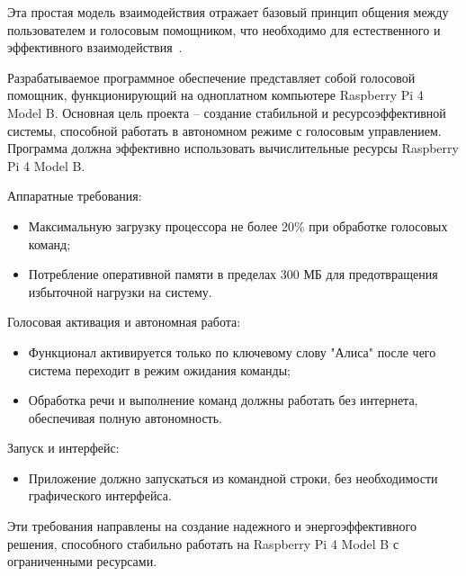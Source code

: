  Эта простая модель взаимодействия отражает базовый принцип общения между пользователем и голосовым помощником, что необходимо для естественного и эффективного взаимодействия~\cite{name22}.
 
Разрабатываемое программное обеспечение представляет собой голосовой помощник, функционирующий на одноплатном компьютере Raspberry Pi 4 Model B.
Основная цель проекта -- создание стабильной и ресурсоэффективной системы, способной работать в автономном режиме с голосовым управлением.
Программа должна эффективно использовать вычислительные ресурсы Raspberry Pi 4 Model B.

Аппаратные требования:
\begin{itemize}
	\item Максимальную загрузку процессора не более 20\% при обработке голосовых команд;
	\item Потребление оперативной памяти в пределах 300 МБ для предотвращения избыточной нагрузки на систему.
\end{itemize}

Голосовая активация и автономная работа:
\begin{itemize}
	\item Функционал активируется только по ключевому слову "Алиса" после чего система переходит в режим ожидания команды;
	\item Обработка речи и выполнение команд должны работать без интернета, обеспечивая полную автономность.
\end{itemize}

Запуск и интерфейс:
\begin{itemize}
	\item Приложение должно запускаться из командной строки, без необходимости графического интерфейса.
\end{itemize}

Эти требования направлены на создание надежного и энергоэффективного решения, способного стабильно работать на Raspberry Pi 4 Model B с ограниченными ресурсами.
\newpage
